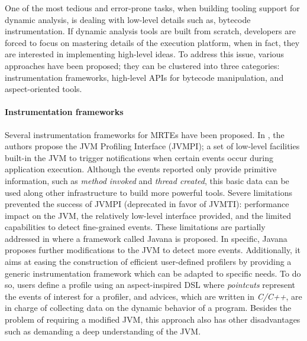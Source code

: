 One of the most tedious and error-prone tasks, when building tooling support for dynamic analysis, is dealing with low-level details such as, bytecode instrumentation.
If dynamic analysis tools are built from scratch, developers are forced to focus on mastering details of the execution platform, when in fact, they are interested in implementing high-level ideas.
To address this issue, various approaches have been proposed; they can be clustered into three categories: instrumentation frameworks, high-level APIs for bytecode manipulation, and aspect-oriented tools.

\paragraph{Instrumentation frameworks}
Several instrumentation frameworks for MRTEs have been proposed.
In \cite{Liang1999}, the authors propose the JVM Profiling Interface (JVMPI); a set of low-level facilities built-in the JVM to trigger notifications when certain events occur during application execution.
Although the events reported only provide primitive information, such as \textit{method invoked} and \textit{thread created}, this basic data can be used along other infrastructure to build more powerful tools.
Severe limitations prevented the success of JVMPI (deprecated in favor of JVMTI): performance impact on the JVM, the relatively low-level interface provided, and the limited capabilities to detect fine-grained events.
These limitations are partially addressed in \cite{Maebe06javana:a} where a framework called Javana is proposed.
In specific, Javana proposes further modifications to the JVM to detect more events.
Additionally, it aims at easing the construction of efficient user-defined profilers by providing a generic instrumentation framework which can be adapted to specific needs.
To do so, users define a profile using an aspect-inspired DSL where \textit{pointcuts} represent the events of interest for a profiler, and advices, which are written in \textit{C/C++}, are in charge of collecting data on the dynamic behavior of a program.
Besides the problem of requiring a modified JVM, this approach also has other disadvantages such as demanding a deep understanding of the JVM.

